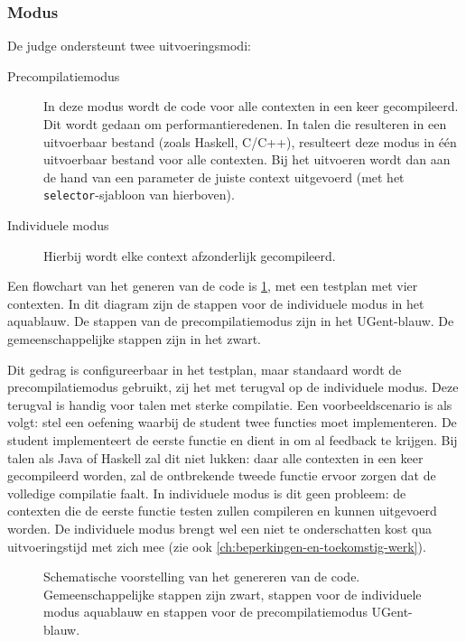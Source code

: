 \subsubsection{Modus}\label{sss:modus}

De judge ondersteunt twee uitvoeringsmodi:
\begin{description}
    \item[Precompilatiemodus] In deze modus wordt de code voor alle contexten in een keer gecompileerd.
    Dit wordt gedaan om performantieredenen.
    In talen die resulteren in een uitvoerbaar bestand (zoals Haskell, C/C++), resulteert deze modus in één uitvoerbaar bestand voor alle contexten.
    Bij het uitvoeren wordt dan aan de hand van een parameter de juiste context uitgevoerd (met het \texttt{selector}-sjabloon van hierboven).
    \item[Individuele modus] Hierbij wordt elke context afzonderlijk gecompileerd.
\end{description}

Een flowchart van het generen van de code is \cref{fig:generation}, met een testplan met vier contexten.
In dit diagram zijn de stappen voor de individuele modus in het \textcolor{ugent-we}{aquablauw}.
De stappen van de precompilatiemodus zijn in het \textcolor{ugent-blue}{UGent-blauw}.
De gemeenschappelijke stappen zijn in het zwart.

Dit gedrag is configureerbaar in het testplan, maar standaard wordt de precompilatiemodus gebruikt, zij het met terugval op de individuele modus.
Deze terugval is handig voor talen met sterke compilatie.
Een voorbeeldscenario is als volgt: stel een oefening waarbij de student twee functies moet implementeren.
De student implementeert de eerste functie en dient in om al feedback te krijgen.
Bij talen als Java of Haskell zal dit niet lukken: daar alle contexten in een keer gecompileerd worden, zal de ontbrekende tweede functie ervoor zorgen dat de volledige compilatie faalt.
In individuele modus is dit geen probleem: de contexten die de eerste functie testen zullen compileren en kunnen uitgevoerd worden.
De individuele modus brengt wel een niet te onderschatten kost qua uitvoeringstijd met zich mee (zie ook \cref{ch:beperkingen-en-toekomstig-werk}).

\begin{figure}
    \begin{adjustbox}{width=\textwidth}
        
    \end{adjustbox}
    \caption{
        Schematische voorstelling van het genereren van de code.
        Gemeenschappelijke stappen zijn zwart, stappen voor de individuele modus \textcolor{ugent-we}{aquablauw} en stappen voor de precompilatiemodus \textcolor{ugent-blue}{UGent-blauw}.
    }
    \label{fig:generation}
\end{figure}


